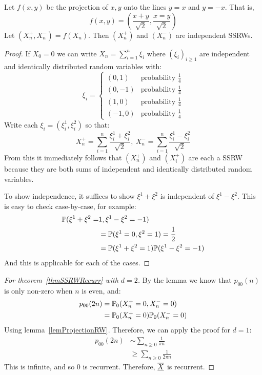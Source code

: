 \documentclass[../Main.tex]{subfiles}
\begin{document}
\begin{lemma}
    Let $f(x, y)$ be the projection of $x, y$ onto the lines $y = x$ and $y = -x$. That is,
    \begin{equation*}
        f(x, y) = \left(\frac{x + y}{\sqrt{2}}, \frac{x=y}{\sqrt{2}}\right)
    \end{equation*}
    Let $(X_n^+, X_n^-) = f(X_n)$. Then $(X_n^+)$ and $(X_n^-)$ are independent SSRWs.
    \label{lemProjectionRW}
\end{lemma}
\begin{proof}
    If $X_0 = 0$ we can write $X_n = \sum_{i=1}^n \xi_i$ where $(\xi_i)_{i \geq 1}$ are independent and identically distributed random variables with:
    \begin{equation*}
       \xi_i =
       \begin{cases}
        (0, 1) & \text{probability } \frac14 \\
        (0, -1) & \text{probability } \frac14 \\
        (1, 0) & \text{probability } \frac14 \\
        (-1, 0) & \text{probability } \frac14
       \end{cases} 
    \end{equation*}
    Write each $\xi_i = (\xi_i^1, \xi_i^2)$ so that:
    \begin{equation*}
        X_n^+ = \sum_{i=1}^{n} \frac{\xi_i^1 +\xi_i^2}{\sqrt{2}},~X_n^- = \sum_{i=1}^{n} \frac{\xi_i^1 -\xi_i^2}{\sqrt{2}}
    \end{equation*}
    From this it immediately follows that $(X_n^+)$ and $(X_i^+)$ are each a SSRW because they are both sums of independent and identically distributed random variables.

    To show independence, it suffices to show $\xi^1 + \xi^2$ is independent of $\xi^1 - \xi^2$. This is easy to check case-by-case, for example:
    \begin{align*}
        \P(\xi^1 + \xi^2 =& 1, \xi^1 - \xi^2 = -1) \\
        &= \P(\xi^1 = 0, \xi^2 = 1) = \frac12 \\
        &= \P(\xi^1 + \xi^2 = 1) \P(\xi^1 - \xi^2 = -1)
    \end{align*}
    And this is applicable for each of the cases.
\end{proof}
\begin{proof}[For theorem~\ref{thmSSRWRecurr} with $d = 2$]
    By the lemma we know that $p_{00}(n)$ is only non-zero when $n$ is even, and:
    \begin{align*}
        p_{00}(2n) &= \P_0(X_n^+ = 0, X_n^- = 0) \\
        &=\P_0(X_n^+ = 0) \P_0(X_n^- = 0) \\
    \end{align*}
    Using lemma~\ref{lemProjectionRW}. Therefore, we can apply the proof for $d = 1$:
    \begin{align*}
        p_{00}(2n) &\sim \sum_{n \geq 0}\frac{1}{\pi n} \\
        & \geq \sum_{n \geq 0} \frac{1}{2\pi n}
    \end{align*}
    This is infinite, and so $0$ is recurrent. Therefore, $\chain{X}$ is recurrent.
\end{proof}
\end{document}
